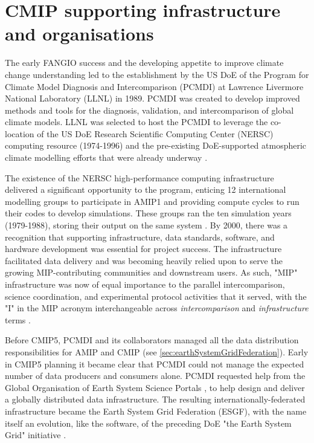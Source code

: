 \documentclass[manuscript]{copernicus}
\begin{document}
\section{CMIP supporting infrastructure and organisations}
\label{sec:CMIPSupportingOrgsAndInfra}

The early FANGIO success and the developing appetite to improve climate change understanding led to the establishment by the US DoE of the Program for Climate Model Diagnosis and Intercomparison (PCMDI) at Lawrence Livermore National Laboratory (LLNL) in 1989. PCMDI was created to develop improved methods and tools for the diagnosis, validation, and intercomparison of global climate models. LLNL was selected to host the PCMDI to leverage the co-location of the US DoE Research Scientific Computing Center (NERSC) computing resource (1974-1996) and the pre-existing DoE-supported atmospheric climate modelling efforts that were already underway \citep[e.g.,][]{maccracken_projecting_1985,potter_celebrating_2011}.

The existence of the NERSC high-performance computing infrastructure delivered a significant opportunity to the program, enticing 12 international modelling groups to participate in AMIP1 and providing compute cycles to run their codes to develop simulations. These groups ran the ten simulation years (1979-1988), storing their output on the same system \citep{gates_amip_1991, gates_amip_1992}. By 2000, there was a recognition that supporting infrastructure, data standards, software, and hardware development was essential for project success. The infrastructure facilitated data delivery and was becoming heavily relied upon to serve the growing MIP-contributing communities and downstream users. As such, "MIP" infrastructure was now of equal importance to the parallel intercomparison, science coordination, and experimental protocol activities that it served, with the "I" in the MIP acronym interchangeable across \textit{intercomparison} and \emph{infrastructure} terms \citep{gleckler_amip_2001}.

Before CMIP5, PCMDI and its collaborators managed all the data distribution responsibilities for AMIP and CMIP (see \autoref{sec:earthSystemGridFederation}). Early in CMIP5 planning it became clear that PCMDI could not manage the expected number of data producers and consumers alone. PCMDI requested help from the Global Organisation of Earth System Science Portals \citep[GO-ESSP; see][]{williams_earth_2009}, to help design and deliver a globally distributed data infrastructure. The resulting internationally-federated infrastructure became the Earth System Grid Federation (ESGF), with the name itself an evolution, like the software, of the preceding DoE "the Earth System Grid" initiative \citep[see \autoref{sec:earthSystemGridFederation};][]{williams_earth_2009}.
\end{document}
